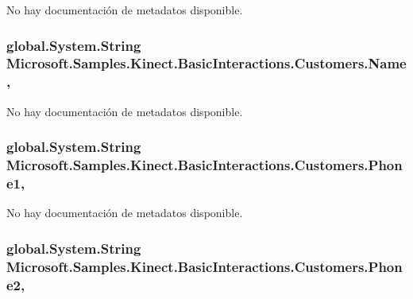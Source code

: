 No hay documentación de metadatos disponible. 

\hypertarget{class_microsoft_1_1_samples_1_1_kinect_1_1_basic_interactions_1_1_customers_ad2cd1282f1bf9bcd6dc07927a26bddeb}{
\subsubsection[{Name}]{\setlength{\rightskip}{0pt plus 5cm}global.\-System.\-String Microsoft.\-Samples.\-Kinect.\-Basic\-Interactions.\-Customers.\-Name\hspace{0.3cm}{\ttfamily [get]}, {\ttfamily [set]}}}\label{class_microsoft_1_1_samples_1_1_kinect_1_1_basic_interactions_1_1_customers_ad2cd1282f1bf9bcd6dc07927a26bddeb}


No hay documentación de metadatos disponible. 

\hypertarget{class_microsoft_1_1_samples_1_1_kinect_1_1_basic_interactions_1_1_customers_ac75d5572f76e532eeb33d37279b6e12f}{
\subsubsection[{Phone1}]{\setlength{\rightskip}{0pt plus 5cm}global.\-System.\-String Microsoft.\-Samples.\-Kinect.\-Basic\-Interactions.\-Customers.\-Phone1\hspace{0.3cm}{\ttfamily [get]}, {\ttfamily [set]}}}\label{class_microsoft_1_1_samples_1_1_kinect_1_1_basic_interactions_1_1_customers_ac75d5572f76e532eeb33d37279b6e12f}


No hay documentación de metadatos disponible. 

\hypertarget{class_microsoft_1_1_samples_1_1_kinect_1_1_basic_interactions_1_1_customers_a90acf22a41fd892367045214c4dad1ae}{
\subsubsection[{Phone2}]{\setlength{\rightskip}{0pt plus 5cm}global.\-System.\-String Microsoft.\-Samples.\-Kinect.\-Basic\-Interactions.\-Customers.\-Phone2\hspace{0.3cm}{\ttfamily [get]}, {\ttfamily [set]}}}\label{class_microsoft_1_1_samples_1_1_kinect_1_1_basic_interactions_1_1_customers_a90acf22a41fd892367045214c4dad1ae}


